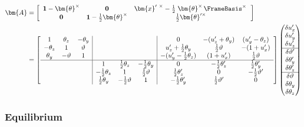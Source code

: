 \begin{equation*}
\begin{aligned}
\bm{A} &= 
\left[\begin{array}{ccc}
\mathbf{1} - \bm{\theta}^{\times}& \mathbf{0} & \bm{x}^{\prime~\times} - \frac{1}{2}\left.\bm{\theta}^{\times}\,\FrameBasis^{\times}\right.\\
\mathbf{0} & \mathbf{1} -\frac{1}{2}\bm{\theta}^{\times} & \frac{1}{2}\bm{\theta}^{\prime \times}
\end{array}\right] \\
&=\left[\begin{array}{ccc|ccc|ccc}
1 & \theta_z & -\theta_y & & & & 0 & -(u_z^{\prime}+\theta_y) & (u_y^{\prime} - \theta_z) \\
-\theta_z & 1 & \vartheta &  &  &  &  u_z^{\prime} + \frac{1}{2}\theta_y & \frac{1}{2}\vartheta & -(1 + u_x^{\prime}) \\
\theta_y & -\vartheta & 1 & & & & -(u_y^{\prime} - \frac{1}{2}\theta_z) & (1+u_x^{\prime}) & \frac{1}{2}\vartheta \\ \hline
&&& 1 & \frac{1}{2}\theta_z & -\frac{1}{2}\theta_y & 0 & -\frac{1}{2}\theta_z^{\prime} & \frac{1}{2}\theta_y^{\prime} \\
& & & -\frac{1}{2}\theta_z & 1 & \frac{1}{2}\vartheta & \frac{1}{2}\theta_z^{\prime} & 0 & -\frac{1}{2} \vartheta^{\prime} \\
& & & \frac{1}{2}\theta_y & -\frac{1}{2}\vartheta & 1 & -\frac{1}{2}\theta_y^{\prime} & \frac{1}{2}\vartheta^{\prime} & 0
\end{array}\right]
\begin{pmatrix}
\delta u_x^{\prime} \\
\delta u_y^{\prime} \\
\delta u_z^{\prime} \\ \hline
\delta \vartheta^{\prime} \\ 
\delta \theta_y^{\prime} \\
\delta \theta_z^{\prime} \\ \hline
\delta \vartheta \\ 
\delta \theta_y \\
\delta \theta_z \\
\end{pmatrix}
\end{aligned}
\end{equation*}

\subsubsection{Equilibrium}


